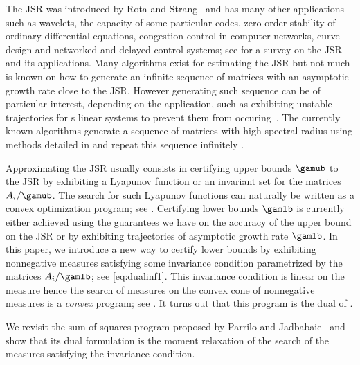 The JSR was introduced by Rota and Strang~\cite{rota1960note}
and has many other applications such as wavelets, the capacity of some particular codes, zero-order stability of ordinary differential equations, congestion control in computer networks, curve design and networked and delayed control systems; see \cite{jungers2009joint} for a survey on the JSR and its applications.
Many algorithms exist for estimating the JSR but not much is known on how to generate an infinite
sequence of matrices with an asymptotic growth rate close to the JSR.
However generating such sequence can be of particular interest, depending on the application,
such as exhibiting unstable trajectories for s\witch{} linear systems to prevent them from occuring~\cite{gomes2018minimally}.%
The currently known algorithms generate a sequence of matrices with high spectral radius
using methods detailed in 
and repeat this sequence infinitely \cite{gripenberg1996computing,guglielmi2008algorithm,guglielmi2013exact,jungers2014lifted}.

Approximating the JSR usually consists in certifying upper bounds $\gamub$ to the JSR by exhibiting a Lyapunov function or an invariant set for the matrices $A_i/\gamub$.
The search for such Lyapunov functions can naturally be written as a convex optimization program; see .
Certifying lower bounds $\gamlb$ is currently either achieved using the guarantees we have on the accuracy of the upper bound on the JSR
or by exhibiting trajectories of asymptotic growth rate $\gamlb$.
In this paper, we introduce a new way to certify lower bounds by exhibiting nonnegative measures satisfying some invariance condition parametrized by the matrices $A_i/\gamlb$; see \eqref{eq:dualinf1}.
This invariance condition is linear on the measure hence the search of measures on the convex cone of nonnegative measures is a \emph{convex} program; see .
It turns out that this program is the dual of .

We revisit the sum-of-squares program proposed by Parrilo and Jadbabaie~\cite{parrilo2008approximation} and show that its dual formulation is the moment relaxation of the search of the measures satisfying the invariance condition.

